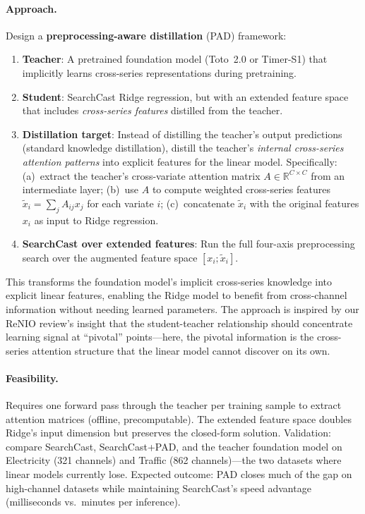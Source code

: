 \documentclass[11pt,a4paper]{article}
\begin{document}
\paragraph{Approach.} Design a \textbf{preprocessing-aware distillation} (PAD) framework:
\begin{enumerate}
\item \textbf{Teacher}: A pretrained foundation model (Toto~2.0 or Timer-S1) that implicitly learns cross-series representations during pretraining.
\item \textbf{Student}: SearchCast Ridge regression, but with an extended feature space that includes \emph{cross-series features} distilled from the teacher.
\item \textbf{Distillation target}: Instead of distilling the teacher's output predictions (standard knowledge distillation), distill the teacher's \emph{internal cross-series attention patterns} into explicit features for the linear model. Specifically: (a)~extract the teacher's cross-variate attention matrix $A \in \mathbb{R}^{C \times C}$ from an intermediate layer; (b)~use $A$ to compute weighted cross-series features $\tilde{x}_i = \sum_j A_{ij} x_j$ for each variate $i$; (c)~concatenate $\tilde{x}_i$ with the original features $x_i$ as input to Ridge regression.
\item \textbf{SearchCast over extended features}: Run the full four-axis preprocessing search over the augmented feature space $[x_i; \tilde{x}_i]$.
\end{enumerate}
This transforms the foundation model's implicit cross-series knowledge into explicit linear features, enabling the Ridge model to benefit from cross-channel information without needing learned parameters. The approach is inspired by our ReNIO review's insight that the student-teacher relationship should concentrate learning signal at ``pivotal'' points---here, the pivotal information is the cross-series attention structure that the linear model cannot discover on its own.

\paragraph{Feasibility.} Requires one forward pass through the teacher per training sample to extract attention matrices (offline, precomputable). The extended feature space doubles Ridge's input dimension but preserves the closed-form solution. Validation: compare SearchCast, SearchCast+PAD, and the teacher foundation model on Electricity (321 channels) and Traffic (862 channels)---the two datasets where linear models currently lose. Expected outcome: PAD closes much of the gap on high-channel datasets while maintaining SearchCast's speed advantage (milliseconds vs.\ minutes per inference).
\end{document}
